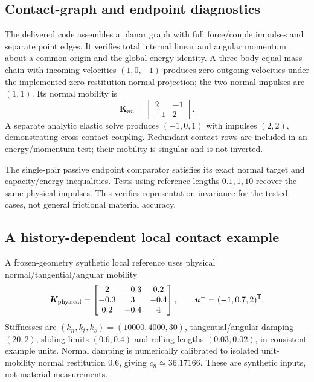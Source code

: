 \documentclass[11pt,a4paper]{article}
\newcommand{\bv}[1]{\bm{#1}}\newcommand{\inertia}{\mathbb I}
\begin{document}
\subsection{Contact-graph and endpoint diagnostics}
The delivered code assembles a planar graph with full force/couple impulses and separate point edges. It verifies total internal linear and angular momentum about a common origin and the global energy identity. A three-body equal-mass chain with incoming velocities $(1,0,-1)$ produces zero outgoing velocities under the implemented zero-restitution normal projection; the two normal impulses are $(1,1)$. Its normal mobility is
\begin{equation}
\bv K_{nn}=\begin{bmatrix}2&-1\\-1&2\end{bmatrix}.
\end{equation}
A separate analytic elastic solve produces $(-1,0,1)$ with impulses $(2,2)$, demonstrating cross-contact coupling. Redundant contact rows are included in an energy/momentum test; their mobility is singular and is not inverted.

The single-pair passive endpoint comparator satisfies its exact normal target and capacity/energy inequalities. Tests using reference lengths $0.1,1,10$ recover the same physical impulses. This verifies representation invariance for the tested cases, not general frictional material accuracy.

\subsection{A history-dependent local contact example}
A frozen-geometry synthetic local reference uses physical normal/tangential/angular mobility
\begin{equation}
\bv K_{\rm physical}=\begin{bmatrix}2&-0.3&0.2\\-0.3&3&-0.4\\0.2&-0.4&4\end{bmatrix},
\qquad \bv u^-=(-1,0.7,2)^{\mathsf T}.
\end{equation}
Stiffnesses are $(k_n,k_t,k_s)=(10000,4000,30)$, tangential/angular damping $(20,2)$, sliding limits $(0.6,0.4)$ and rolling lengths $(0.03,0.02)$, in consistent example units. Normal damping is numerically calibrated to isolated unit-mobility normal restitution $0.6$, giving $c_n\simeq36.17166$. These are synthetic inputs, not material measurements.
\end{document}
